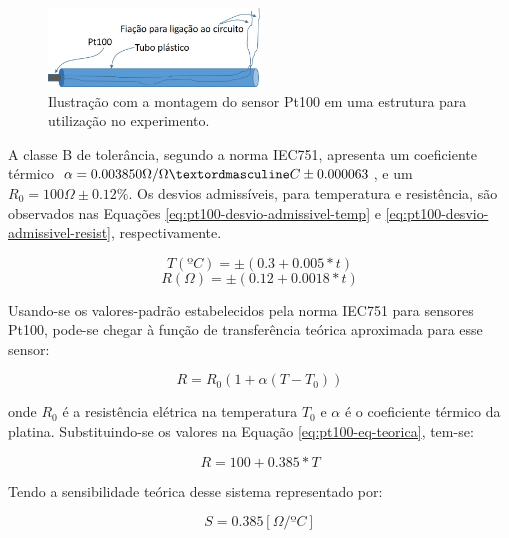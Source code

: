 \documentclass[a4paper]{instrumentacao}
\begin{document}
\begin{figure}[H]
	\centering \includegraphics[width=0.5\textwidth]{termometro-ilustracao.jpg}
	\caption{Ilustração com a montagem do sensor Pt100 em uma estrutura para utilização no experimento.}

	\label{fig:termometro-ilustracao}
\end{figure}

A classe B de tolerância, segundo a norma IEC751, apresenta um coeficiente térmico $\alpha = 0.003850 \Omega/\OmegaºC \pm 0.000063$, e um $R_0= 100\Omega \pm 0.12\%$. Os desvios admissíveis, para temperatura e resistência, são observados nas Equações \ref{eq:pt100-desvio-admissivel-temp} e \ref{eq:pt100-desvio-admissivel-resist}, respectivamente.

\begin{equation}
	T(ºC)=\pm (0.3+0.005*t)
	\label{eq:pt100-desvio-admissivel-temp}
\end{equation}
\begin{equation}
	R(\Omega)=\pm (0.12+0.0018*t)
	\label{eq:pt100-desvio-admissivel-resist}
\end{equation}

Usando-se os valores-padrão estabelecidos pela norma IEC751 para sensores Pt100, pode-se chegar à função de transferência teórica aproximada para esse sensor:

\begin{equation}
	R=R_0(1+\alpha(T-T_0))
	\label{eq:pt100-eq-teorica}
\end{equation}

\noindent onde $R_0$ é a resistência elétrica na temperatura $T_0$ e $\alpha$ é o coeficiente térmico da platina. Substituindo-se os valores na Equação \ref{eq:pt100-eq-teorica}, tem-se:

\begin{equation}
	R=100+0.385*T
	\label{eq:pt100-eq-teorica-valor}
\end{equation}

Tendo a sensibilidade teórica desse sistema representado por:

\begin{equation}
	S=0.385 [\Omega/ºC]
	\label{eq:pt100-sensibilidade-teorica-valor}
\end{equation}
\end{document}
